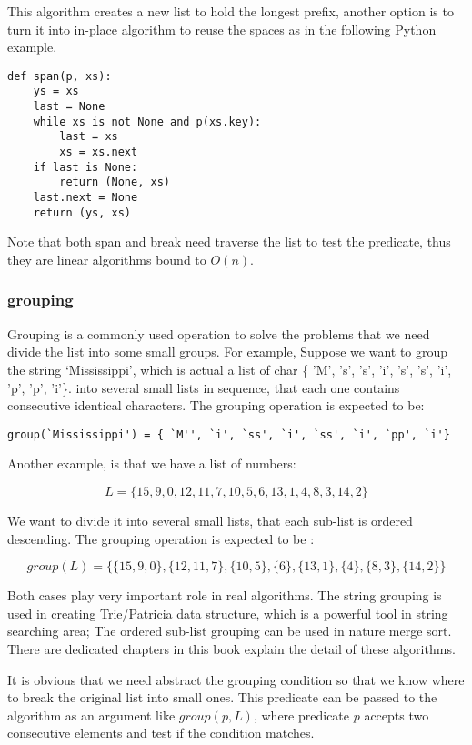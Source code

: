 \documentclass[b5paper]{article}
\begin{document}
This algorithm creates a new list to hold the longest prefix, another option is to turn it
into in-place algorithm to reuse the spaces as in the following Python example.

\lstset{language=Python}
\begin{lstlisting}
def span(p, xs):
    ys = xs
    last = None
    while xs is not None and p(xs.key):
        last = xs
        xs = xs.next
    if last is None:
        return (None, xs)
    last.next = None
    return (ys, xs)
\end{lstlisting}

Note that both span and break need traverse the list to test the predicate, thus they are linear
algorithms bound to $O(n)$.

\subsubsection{grouping}
Grouping is a commonly used operation to solve the problems that we need divide the list into some small groups.
For example, Suppose we want to group the
string `Mississippi', which is actual a list of char \{ 'M', 's', 's', 'i', 's', 's', 'i', 'p', 'p', 'i'\}.
into several small lists in sequence, that each one contains consecutive identical characters. The grouping
operation is expected to be:

\begin{verbatim}
group(`Mississippi') = { `M'', `i', `ss', `i', `ss', `i', `pp', `i'}
\end{verbatim}

Another example, is that we have a list of numbers:

\[
L = \{15, 9, 0, 12, 11, 7, 10, 5, 6, 13, 1, 4, 8, 3, 14, 2\}
\]

We want to divide it into several small lists, that each sub-list is ordered descending.
The grouping operation is expected to be :

\[
group(L) = \{ \{15, 9, 0\}, \{12, 11, 7\}, \{10, 5\}, \{6\}, \{13, 1\}, \{4\}, \{8, 3\}, \{14, 2\}\}
\]

Both cases play very important role in real algorithms. The string grouping is used in creating Trie/Patricia
data structure, which is a powerful tool in string searching area; The ordered sub-list grouping can be used in
nature merge sort. There are dedicated chapters in this book explain the detail of these algorithms.

It is obvious that we need abstract the grouping condition so that we know where to break the original list into
small ones. This predicate can be passed to the algorithm as an argument like $group(p, L)$, where predicate
$p$ accepts two consecutive elements and test if the condition matches.
\end{document}
